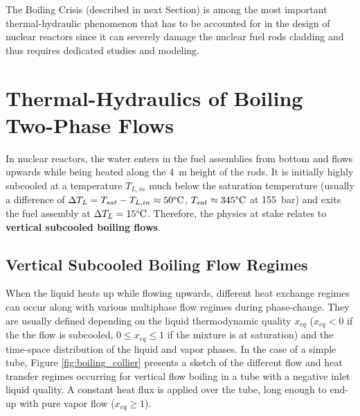\npar

The Boiling Crisis (described in next Section) is among the most important thermal-hydraulic phenomenon that has to be accounted for in the design of nuclear reactors since it can severely damage the nuclear fuel rods cladding and thus requires dedicated studies and modeling. %


\section{Thermal-Hydraulics of Boiling Two-Phase Flows}

In nuclear reactors, the water enters in the fuel assemblies from bottom and flows upwards while being heated along the 4~m height of the rods. It is initially highly subcooled \ie at a temperature $T_{L,in}$ much below the saturation temperature (usually a difference of $\Delta T_{L} = T_{sat}-T_{L,in} \approx 50 \degree\mathrm{C}$, $T_{sat} \approx 345\degree\mathrm{C}$ at 155\ bar) and exits the fuel assembly at $\Delta T_{L} = 15\degree\mathrm{C}$. Therefore, the physics at stake relates to \textbf{vertical subcooled boiling flows}.


\subsection{Vertical Subcooled Boiling Flow Regimes}

When the liquid heats up while flowing upwards, different heat exchange regimes can occur along with various multiphase flow regimes during phase-change. They are usually defined depending on the liquid thermodynamic quality $x_{eq}$ ($x_{eq}<0$ if the the flow is subcooled, $0 \leq x_{eq} \leq 1$ if the mixture is at saturation) and the time-space distribution of the liquid and vapor phases. In the case of a simple tube, Figure \ref{fig:boiling_collier} presents a sketch of the different flow and heat transfer regimes occurring for vertical flow boiling in a tube with a negative inlet liquid quality. A constant heat flux is applied over the tube, long enough to end-up with pure vapor flow ($x_{eq} \geq 1$).


